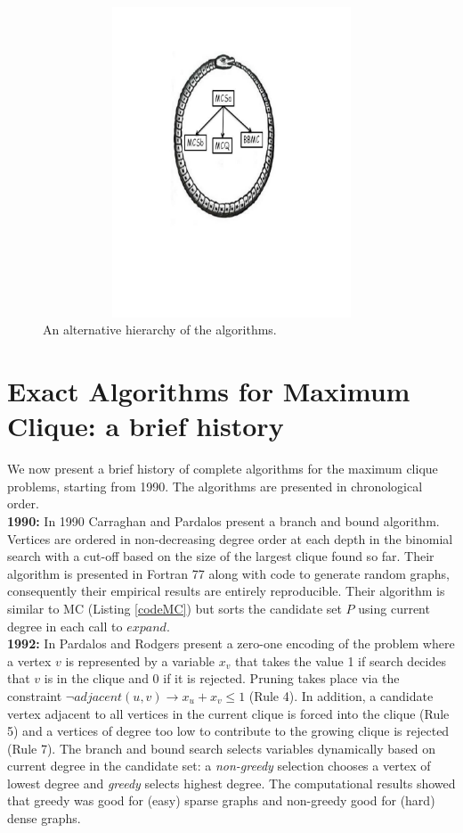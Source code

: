 \documentclass{l4proj}
\begin{document}
\vspace{-7mm}
\begin{figure}
\centering
\includegraphics[height=9.2cm,width=13.2cm]{uroboros.pdf}
\vspace{-30mm}
\caption{An alternative hierarchy of the algorithms.}
\label{uroborus}
\end{figure}

%
\chapter{Exact Algorithms for Maximum Clique: a brief history}
We now present a brief history of complete algorithms for the maximum clique problems, starting from 1990. The algorithms are presented
in chronological order. \\

\noindent
{\bf 1990:} In 1990 \cite{carraghanPardalos90} Carraghan and Pardalos present a branch and bound algorithm. Vertices are ordered
in non-decreasing degree order at each depth in the binomial search with a cut-off based on the size of the largest clique
found so far. Their algorithm is presented in Fortran 77 along with code to generate random graphs, consequently
their empirical results are entirely reproducible. Their algorithm is similar to MC (Listing \ref{codeMC}) but 
sorts the candidate set $P$ using current degree in each call to $expand$. \\

\noindent
{\bf 1992:}
In \cite{pardalosRodgers92}
Pardalos and Rodgers present a zero-one encoding of the problem where a vertex $v$ is represented by a variable
$x_{v}$ that takes the value 1 if search decides that $v$ is in the clique and 0 if it is rejected. Pruning
takes place via the constraint $\neg adjacent(u,v) \rightarrow x_{u} + x_{v} \leq 1$ (Rule 4).  
In addition, a candidate vertex adjacent to all vertices in 
the current clique is forced into the clique (Rule 5) and a vertices of degree too low to
contribute to the growing clique is rejected (Rule 7). The branch and
bound search selects variables dynamically based on current degree in the candidate set: a \emph{non-greedy}
selection chooses a vertex of lowest degree and \emph{greedy} selects highest degree. The computational results showed that
greedy was good for (easy) sparse graphs and non-greedy good for (hard) dense graphs.\\
\end{document}
